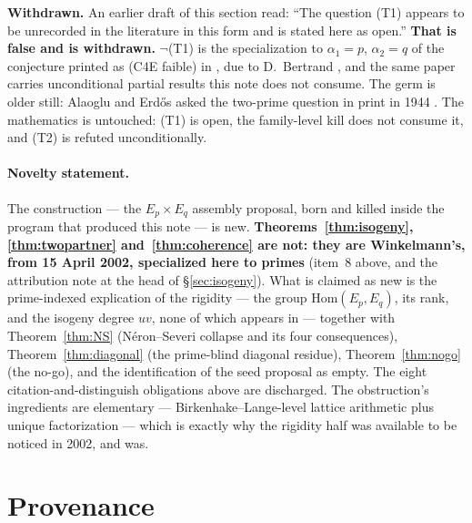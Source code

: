 \documentclass[11pt]{article}
\theoremstyle{definition}
\theoremstyle{remark}
\newcommand{\Hom}{\mathrm{Hom}}
\begin{document}
\medskip

\noindent\textbf{Withdrawn.} An earlier draft of this section read: ``The
question (T1) appears to be unrecorded in the literature in this form and is
stated here as open.'' \textbf{That is false and is withdrawn.} $\neg$(T1) is
the specialization to $\alpha_1 = p$, $\alpha_2 = q$ of the conjecture printed
as (C4E faible) in \cite[p.~231]{Dia97}, due to D.~Bertrand
\cite[\S5]{Ber97}, and the same paper carries unconditional partial results
this note does not consume. The germ is older still: Alaoglu and Erd\H{o}s asked
the two-prime question in print in 1944 \cite[pp.~449, 455]{AE44}. The
mathematics is untouched: (T1) is open, the family-level kill does not consume
it, and (T2) is refuted unconditionally.

\paragraph{Novelty statement.}
The construction --- the $E_p \times E_q$ assembly proposal, born and killed
inside the program that produced this note --- is new.
\textbf{Theorems~\ref{thm:isogeny}, \ref{thm:twopartner} and~\ref{thm:coherence}
are not: they are Winkelmann's, from 15 April 2002, specialized here to primes}
(item~8 above, and the attribution note at the head of \S\ref{sec:isogeny}).
What is claimed as new is the prime-indexed explication of the rigidity --- the
group $\Hom(E_p, E_q)$, its rank, and the isogeny degree $uv$, none of which
appears in \cite{Wi04} --- together with Theorem~\ref{thm:NS} (N\'eron--Severi
collapse and its four consequences), Theorem~\ref{thm:diagonal} (the prime-blind
diagonal residue), Theorem~\ref{thm:nogo} (the no-go), and the identification of
the seed proposal as empty. The eight citation-and-distinguish obligations above
are discharged. The obstruction's ingredients are elementary ---
Birkenhake--Lange-level lattice arithmetic plus unique factorization --- which is
exactly why the rigidity half was available to be noticed in 2002, and was.

\section*{Provenance}
\end{document}
